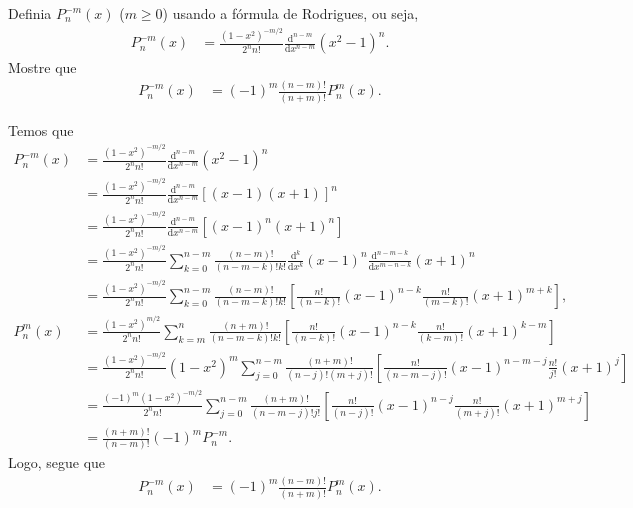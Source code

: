 \documentclass[a4paper,12pt, leqno, answers]{exam}
\begin{document}
\begin{questions}
    \question Definia $P_n^{-m}(x)$ ($m \geq 0$) usando a f\'{o}rmula de Rodrigues, ou seja,
    \begin{align*}
        P_n^{-m}(x) &= \frac{(1 - x^2)^{-m/2}}{2^n n!} \frac{\mathrm{d}^{n - m}}{\mathrm{d}x^{n - m}}\left( x^2 - 1 \right)^n.
    \end{align*}
    Mostre que
    \begin{align*}
        P_n^{-m}(x) &= (-1)^m \frac{(n - m)!}{(n + m)!} P_n^m(x).
    \end{align*}
    \begin{solution}
        Temos que
        \begin{align*}
            P_n^{-m}(x) &= \frac{(1 - x^2)^{-m/2}}{2^n n!} \frac{\mathrm{d}^{n - m}}{\mathrm{d}x^{n - m}}(x^2 - 1)^n \\
            &= \frac{(1 - x^2)^{-m/2}}{2^n n!} \frac{\mathrm{d}^{n - m}}{\mathrm{d}x^{n - m}}\left[ (x - 1) (x + 1) \right]^n \\
            &= \frac{(1 - x^2)^{-m/2}}{2^n n!} \frac{\mathrm{d}^{n - m}}{\mathrm{d}x^{n - m}}\left[ (x - 1)^n (x + 1)^n \right] \\
            &= \frac{(1 - x^2)^{-m/2}}{2^n n!} \sum_{k = 0}^{n - m} \frac{(n - m)!}{(n - m - k)! k!} \frac{\mathrm{d}^k}{\mathrm{d}x^k}(x - 1)^n \frac{\mathrm{d}^{n - m - k}}{\mathrm{d}x^{m - n - k}}(x + 1)^n \\
            &= \frac{(1 - x^2)^{-m/2}}{2^n n!} \sum_{k = 0}^{n - m} \frac{(n - m)!}{(n - m - k)! k!} \left[ \frac{n!}{(n - k)!}(x - 1)^{n - k} \frac{n!}{(m - k)!} (x + 1)^{m + k} \right], \\
            P_n^m(x) &= \frac{(1 - x^2)^{m/2}}{2^n n!} \sum_{k = m}^n \frac{(n + m)!}{(n - m - k)! k!} \left[ \frac{n!}{(n - k)!} (x - 1)^{n - k} \frac{n!}{(k - m)!} (x + 1)^{k - m} \right] \\
            &= \frac{(1 - x^2)^{-m/2}}{2^n n!} (1 - x^2)^m \sum_{j = 0}^{n - m} \frac{(n + m)!}{(n - j)! (m + j)!} \left[ \frac{n!}{(n - m - j)!} (x - 1)^{n - m - j} \frac{n!}{j!} (x + 1)^j \right] \\
            &= \frac{(-1)^m (1 - x^2)^{-m/2}}{2^n n!} \sum_{j = 0}^{n - m} \frac{(n + m)!}{(n -m - j)! j!} \left[ \frac{n!}{(n - j)!} (x - 1)^{n - j} \frac{n!}{(m + j)!} (x + 1)^{m + j} \right] \\
            &= \frac{(n + m)!}{(n - m)!} (-1)^m P_n^{-m}.
        \end{align*}
        Logo, segue que
        \begin{align*}
            P_n^{-m}(x) &= (-1)^m \frac{(n - m)!}{(n + m)!} P_n^m(x).
        \end{align*}
    \end{solution}


\end{questions}
\end{document}
